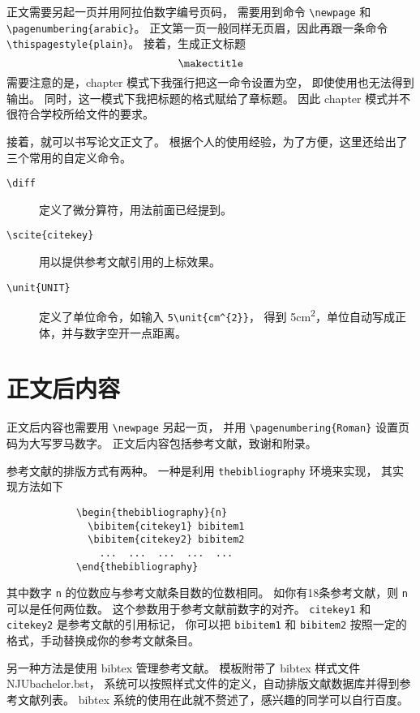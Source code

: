 正文需要另起一页并用阿拉伯数字编号页码，
需要用到命令 \verb|\newpage| 和 \verb|\pagenumbering{arabic}|。
正文第一页一般同样无页眉，因此再跟一条命令 \verb|\thispagestyle{plain}|。
接着，生成正文标题 $$\verb|\makectitle|$$
需要注意的是，chapter 模式下我强行把这一命令设置为空，
即使使用也无法得到输出。
同时，这一模式下我把标题的格式赋给了章标题。
因此 chapter 模式并不很符合学校所给文件的要求。

接着，就可以书写论文正文了。
根据个人的使用经验，为了方便，这里还给出了三个常用的自定义命令。
\begin{description}
  \item[\texttt{\textbackslash{}diff}]
    定义了微分算符，用法前面已经提到。
  \item[\texttt{\textbackslash{}scite\{citekey\}}]
    用以提供参考文献引用的上标效果。
  \item[\texttt{\textbackslash{}unit\{UNIT\}}]
    定义了单位命令，如输入 \verb|5\unit{cm^{2}}|，
    得到 5\unit{cm^{2}}，单位自动写成正体，并与数字空开一点距离。
\end{description}

\section{正文后内容}

正文后内容也需要用 \verb|\newpage| 另起一页，
并用 \verb|\pagenumbering{Roman}| 设置页码为大写罗马数字。
正文后内容包括参考文献，致谢和附录。

参考文献的排版方式有两种。
一种是利用 \verb|thebibliography| 环境来实现，
其实现方法如下

{\vspace{-0.2em}%
\begin{verbatim}
            \begin{thebibliography}{n}
              \bibitem{citekey1} bibitem1
              \bibitem{citekey2} bibitem2
                ...  ...  ...  ...  ...
            \end{thebibliography}
\end{verbatim}}

\vspace{-0.2em}\noindent
其中数字 \texttt{n} 的位数应与参考文献条目数的位数相同。
如你有18条参考文献，则 \texttt{n} 可以是任何两位数。
这个参数用于参考文献前数字的对齐。
\texttt{citekey1} 和 \texttt{citekey2} 是参考文献的引用标记，
你可以把 \texttt{bibitem1} 和 \texttt{bibitem2}
按照一定的格式，手动替换成你的参考文献条目。

另一种方法是使用 bibtex 管理参考文献。
模板附带了 bibtex 样式文件 NJUbachelor.bst，
系统可以按照样式文件的定义，自动排版文献数据库并得到参考文献列表。
bibtex 系统的使用在此就不赘述了，感兴趣的同学可以自行百度。

